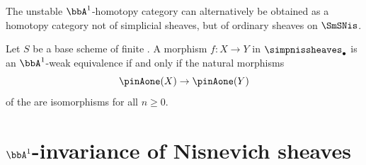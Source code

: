 





The unstable $\bbA^1$-homotopy category can alternatively be obtained as a homotopy category not of simplicial sheaves, but of ordinary sheaves on $\SmSNis$. 





\begin{proposition}
    Let $S$ be a  base scheme of finite . A morphism $f: X \to Y$ in $\simpnissheaves_\bullet$ is an $\bbA^1$-weak equivalence if and only if the natural morphisms
    $$\pinAone(X) \to \pinAone(Y)$$
    of the  are isomorphisms for all $n \geq 0$.
\end{proposition}


\section{\texorpdfstring{$\bbA^1$}{A1}-invariance of Nisnevich sheaves}



